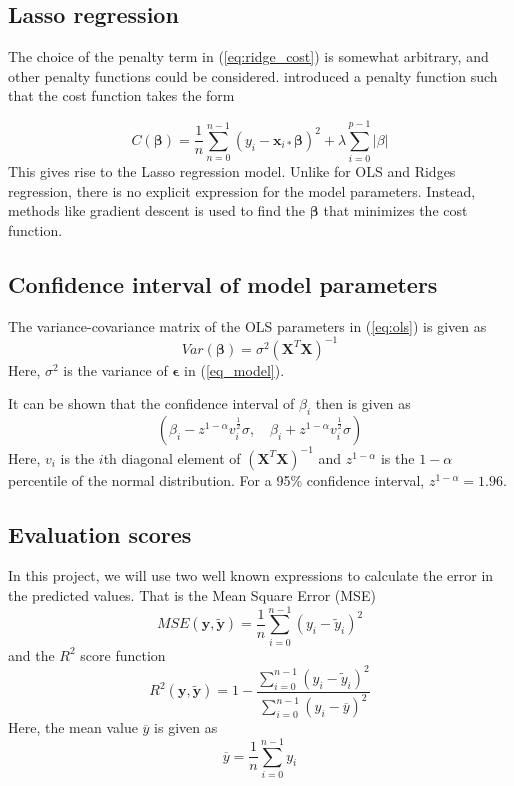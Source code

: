 \subsection{Lasso regression}
The choice of the penalty term in (\ref{eq:ridge_cost}) is somewhat arbitrary, and other penalty functions could be considered. \cite{tibshirani1996lasso} introduced a penalty function such that the cost function takes the form

\begin{equation}\label{eq:lasso}
C(\boldsymbol{\beta})
= \frac{1}{n}\sum_{n=0}^{n-1} \left(y_i-\boldsymbol{x}_{i*}\boldsymbol{\beta}\right)^2 + \lambda \sum_{i=0}^{p-1}\left|\beta\right|
\end{equation}
This gives rise to the Lasso regression model. Unlike for OLS and Ridges regression, there is no explicit expression for the model parameters. Instead, methods like gradient descent is used to find the $\boldsymbol{\beta}$ that minimizes the cost function. 
\subsection{Confidence interval of model parameters}
The variance-covariance matrix of the OLS parameters in (\ref{eq:ols}) is given as 
\begin{equation*}
	Var\left(\boldsymbol{\beta}\right) = \sigma^2\left(\boldsymbol{X}^T\boldsymbol{X}\right)^{-1}
\end{equation*}
Here, $\sigma^2$ is the variance of $\boldsymbol{\epsilon}$ in (\ref{eq_model}). 
 
It can be shown that the confidence interval of $\beta_i$ then is given as \citep{hastie2009elements}
\begin{equation*}
	(\beta_i-z^{1-\alpha}v_i^{\frac{1}{2}}\sigma, \quad \beta_i+z^{1-\alpha}v_i^{\frac{1}{2}}\sigma)
\end{equation*}  
Here, $v_i$ is the $i$th diagonal element of $\left(\boldsymbol{X}^T\boldsymbol{X}\right)^{-1}$ and $z^{1-\alpha}$ is the $1-\alpha$ percentile of the normal distribution. For a 95\% confidence interval, $z^{1-\alpha}=1.96$.

\subsection{Evaluation scores}
In this project, we will use two well known expressions to calculate the error in the predicted values. That is the Mean Square Error (MSE)
\begin{equation}\label{eq:mse}
	MSE(\boldsymbol{y},\boldsymbol{\tilde{y}}) = \frac{1}{n} \sum_{i=0}^{n-1}\left(y_i-\tilde{y}_i\right)^2
\end{equation}
and the $R^2$ score function
\begin{equation}\label{eq:r2}
	R^2(\boldsymbol{y},\boldsymbol{\tilde{y}}) = 1- \frac{\sum_{i=0}^{n-1}\left(y_i-\tilde{y}_i\right)^2}{\sum_{i=0}^{n-1}\left(y_i-\overline{y}\right)^2}
\end{equation}
Here, the mean value $\overline{y}$ is given as
\begin{equation*}
	\overline{y}=\frac{1}{n}\sum_{i=0}^{n-1}y_i
\end{equation*}

